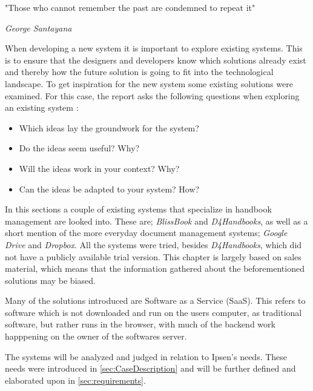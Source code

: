 \epigraph{"Those who cannot remember the past are condemned to repeat it"}{\textit{George Santayana}}
When developing a new system it is important to explore existing systems.
This is to ensure that the designers and developers know which solutions already exist and thereby how the future solution is going to fit into the technological landscape.
To get inspiration for the new system some existing solutions were examined.
For this case, the report asks the following questions when exploring an existing system \citep[p.~33]{Rod-Aalborg}:

\begin{itemize}
  \item Which ideas lay the groundwork for the system?
  \item Do the ideas seem useful? Why?
  \item Will the ideas work in your context? Why?
  \item Can the ideas be adapted to your system? How?
\end{itemize}

In this sections a couple of existing systems that specialize in handbook management are looked into.
These are; \textit{BlissBook} and \textit{D4Handbooks}, as well as a short mention of the more everyday document management systems; \textit{Google Drive} and \textit{Dropbox}.
All the systems were tried, besides \textit{D4Handbooks}, which did not have a publicly available trial version.
This chapter is largely based on sales material, which means that the information gathered about the beforementioned solutions may be biased.

Many of the solutions introduced are Software as a Service (SaaS).
This refers to software which is not downloaded and run on the users computer, as traditional software, but rather runs in the browser, with much of the backend work happpening on the owner of the softwares server. %

The systems will be analyzed and judged in relation to Ipsen's needs.
These needs were introduced in \ref{sec:CaseDescription} and will be further defined and elaborated upon in \ref{sec:requirements}.
